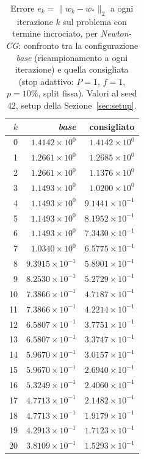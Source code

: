 \begin{table}[H]
\centering
\footnotesize
\renewcommand{\arraystretch}{0.85}
\setlength{\tabcolsep}{8pt}
\caption{Errore $e_k=\|w_k-w_*\|_2$ a ogni iterazione $k$ sul problema con termine incrociato, per \emph{Newton-CG}: confronto tra la configurazione \emph{base} (ricampionamento a ogni iterazione) e quella consigliata (stop adattivo: $P{=}1$, $f{=}1$, $p{=}10\%$, split fissa). Valori al seed 42, setup della Sezione~\ref{sec:setup}.}
\label{tab:riuso_cons_offdiag_ncg}
\begin{tabular}{@{}rrr@{}}
\toprule
$k$ & \emph{base} & consigliato\\
\midrule
0 & $1.4142\times10^{0}$ & $1.4142\times10^{0}$\\
1 & $1.2661\times10^{0}$ & $1.2685\times10^{0}$\\
2 & $1.2661\times10^{0}$ & $1.1376\times10^{0}$\\
3 & $1.1493\times10^{0}$ & $1.0200\times10^{0}$\\
4 & $1.1493\times10^{0}$ & $9.1441\times10^{-1}$\\
5 & $1.1493\times10^{0}$ & $8.1952\times10^{-1}$\\
6 & $1.1493\times10^{0}$ & $7.3430\times10^{-1}$\\
7 & $1.0340\times10^{0}$ & $6.5775\times10^{-1}$\\
8 & $9.3915\times10^{-1}$ & $5.8901\times10^{-1}$\\
9 & $8.2530\times10^{-1}$ & $5.2729\times10^{-1}$\\
10 & $7.3866\times10^{-1}$ & $4.7187\times10^{-1}$\\
11 & $7.3866\times10^{-1}$ & $4.2214\times10^{-1}$\\
12 & $6.5807\times10^{-1}$ & $3.7751\times10^{-1}$\\
13 & $6.5807\times10^{-1}$ & $3.3747\times10^{-1}$\\
14 & $5.9670\times10^{-1}$ & $3.0157\times10^{-1}$\\
15 & $5.9670\times10^{-1}$ & $2.6940\times10^{-1}$\\
16 & $5.3249\times10^{-1}$ & $2.4060\times10^{-1}$\\
17 & $4.7713\times10^{-1}$ & $2.1482\times10^{-1}$\\
18 & $4.7713\times10^{-1}$ & $1.9179\times10^{-1}$\\
19 & $4.2913\times10^{-1}$ & $1.7123\times10^{-1}$\\
20 & $3.8109\times10^{-1}$ & $1.5293\times10^{-1}$\\

\end{tabular}
\end{table}
